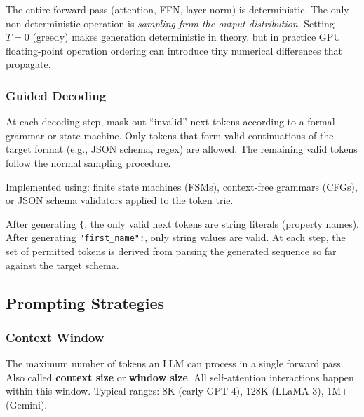 \documentclass[11pt, a4paper]{article}
\begin{document}
\begin{warnbox}
The entire forward pass (attention, FFN, layer norm) is deterministic. The only non-deterministic operation is \emph{sampling from the output distribution}. Setting $T = 0$ (greedy) makes generation deterministic in theory, but in practice GPU floating-point operation ordering can introduce tiny numerical differences that propagate.
\end{warnbox}

\subsubsection{Guided Decoding}

\begin{defbox}
At each decoding step, mask out ``invalid'' next tokens according to a formal grammar or state machine. Only tokens that form valid continuations of the target format (e.g., JSON schema, regex) are allowed. The remaining valid tokens follow the normal sampling procedure.

Implemented using: finite state machines (FSMs), context-free grammars (CFGs), or JSON schema validators applied to the token trie.
\end{defbox}

\begin{exbox}
After generating \texttt{\{}, the only valid next tokens are string literals (property names). After generating \texttt{"first\_name":}, only string values are valid. At each step, the set of permitted tokens is derived from parsing the generated sequence so far against the target schema.
\end{exbox}

\subsection{Prompting Strategies}

\subsubsection{Context Window}

\begin{defbox}
The maximum number of tokens an LLM can process in a single forward pass. Also called \textbf{context size} or \textbf{window size}. All self-attention interactions happen within this window. Typical ranges: 8K (early GPT-4), 128K (LLaMA 3), 1M+ (Gemini).
\end{defbox}
\end{document}
